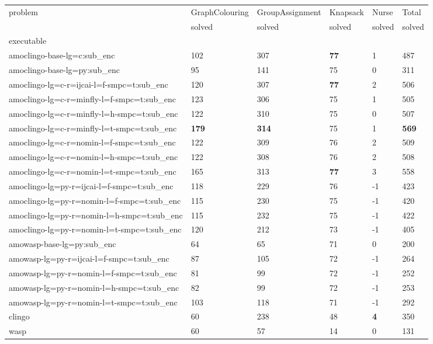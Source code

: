 \documentclass{article}
\begin{document}
            \begin{table}[t!]
\label{tab:results}
\begin{tabular}{llllll}
\toprule
problem & GraphColouring & GroupAssignment & Knapsack & Nurse & Total \\
 & solved & solved & solved & solved & solved \\
executable &  &  &  &  &  \\
\midrule
amoclingo-base-lg=c:sub\_enc & 102 & 307 & \textbf{77} & 1 & 487 \\
amoclingo-base-lg=py:sub\_enc & 95 & 141 & 75 & 0 & 311 \\
amoclingo-lg=c-r=ijcai-l=f-smpc=t:sub\_enc & 120 & 307 & \textbf{77} & 2 & 506 \\
amoclingo-lg=c-r=minfly-l=f-smpc=t:sub\_enc & 123 & 306 & 75 & 1 & 505 \\
amoclingo-lg=c-r=minfly-l=h-smpc=t:sub\_enc & 122 & 310 & 75 & 0 & 507 \\
amoclingo-lg=c-r=minfly-l=t-smpc=t:sub\_enc & \textbf{179} & \textbf{314} & 75 & 1 & \textbf{569} \\
amoclingo-lg=c-r=nomin-l=f-smpc=t:sub\_enc & 122 & 309 & 76 & 2 & 509 \\
amoclingo-lg=c-r=nomin-l=h-smpc=t:sub\_enc & 122 & 308 & 76 & 2 & 508 \\
amoclingo-lg=c-r=nomin-l=t-smpc=t:sub\_enc & 165 & 313 & \textbf{77} & 3 & 558 \\
amoclingo-lg=py-r=ijcai-l=f-smpc=t:sub\_enc & 118 & 229 & 76 & -1 & 423 \\
amoclingo-lg=py-r=nomin-l=f-smpc=t:sub\_enc & 115 & 230 & 75 & -1 & 420 \\
amoclingo-lg=py-r=nomin-l=h-smpc=t:sub\_enc & 115 & 232 & 75 & -1 & 422 \\
amoclingo-lg=py-r=nomin-l=t-smpc=t:sub\_enc & 120 & 212 & 73 & -1 & 405 \\
amowasp-base-lg=py:sub\_enc & 64 & 65 & 71 & 0 & 200 \\
amowasp-lg=py-r=ijcai-l=f-smpc=t:sub\_enc & 87 & 105 & 72 & -1 & 264 \\
amowasp-lg=py-r=nomin-l=f-smpc=t:sub\_enc & 81 & 99 & 72 & -1 & 252 \\
amowasp-lg=py-r=nomin-l=h-smpc=t:sub\_enc & 82 & 99 & 72 & -1 & 253 \\
amowasp-lg=py-r=nomin-l=t-smpc=t:sub\_enc & 103 & 118 & 71 & -1 & 292 \\
clingo & 60 & 238 & 48 & \textbf{4} & 350 \\
wasp & 60 & 57 & 14 & 0 & 131 \\
\bottomrule
\end{tabular}
\end{table}

            
\end{document}
